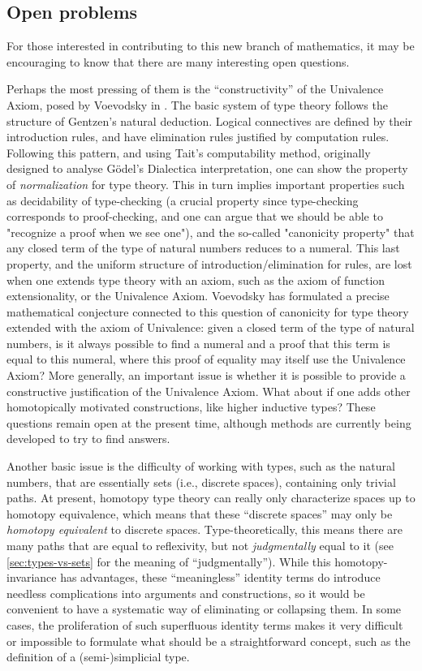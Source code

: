 \subsection*{Open problems} 

For those interested in contributing to this new branch of mathematics, it may be encouraging to know that there are many interesting open questions.

Perhaps the most pressing of them is the ``constructivity'' of the Univalence Axiom, posed by Voevodsky in \cite{Vo2012}.
The basic system of type theory follows the structure of Gentzen's natural deduction. Logical connectives are defined by their introduction rules, and have elimination rules justified by computation rules. Following this pattern, and using Tait's computability method, originally designed to analyse G\"odel's Dialectica interpretation, one can show the property of {\em normalization} for type theory. This in turn implies important properties such as decidability of type-checking (a crucial property since type-checking corresponds to proof-checking, and one can argue that we should be able to "recognize a proof when we see one"), and the so-called "canonicity property" that any closed term of the type of natural numbers reduces to a numeral. This last property, and the uniform structure of introduction/elimination for rules, are lost when one extends type theory with an axiom, such as the axiom of function extensionality, or the Univalence Axiom. Voevodsky has formulated a precise mathematical conjecture connected to this question of canonicity for type theory extended with the axiom of Univalence: given a closed term of the type of natural numbers, is it always possible to find a numeral and a proof that this term is equal to this numeral, where this proof of equality may itself use the Univalence Axiom? More generally, an important issue is whether it is possible to provide a constructive justification of the Univalence Axiom.
What about if one adds other homotopically motivated constructions, like higher inductive types?
These questions remain open at the present time, although methods are currently being developed to try to find answers.

Another basic issue is the difficulty of working with types, such as the natural numbers, that are essentially sets (i.e., discrete spaces), containing only trivial paths.
At present, homotopy type theory can really only characterize spaces up to homotopy equivalence, which means that these ``discrete spaces'' may only be \emph{homotopy equivalent} to discrete spaces.
Type-theoretically, this means there are many paths that are equal to reflexivity, but not \emph{judgmentally} equal to it (see \cref{sec:types-vs-sets} for the meaning of ``judgmentally'').
While this homotopy-invariance has advantages, these ``meaningless'' identity terms do introduce needless complications into arguments and constructions, so it would be convenient to have a systematic way of eliminating or collapsing them.
In some cases, the proliferation of such superfluous identity terms makes it very difficult or impossible to formulate what should be a straightforward concept, such as the definition of a (semi-)simplicial type.

